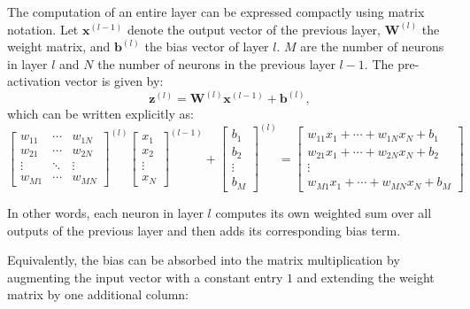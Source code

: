 The computation of an entire layer can be expressed compactly using matrix notation. Let $\mathbf{x}^{(l-1)}$ denote the output vector of the previous layer, $\mathbf{W}^{(l)}$ the weight matrix, and $\mathbf{b}^{(l)}$ the bias vector of layer $l$. $M$ are the number of neurons in layer $l$ and $N$ the number of neurons in the previous layer $l-1$. The pre-activation vector is given by:
\begin{equation}
	\mathbf{z}^{(l)} = \mathbf{W}^{(l)} \mathbf{x}^{(l-1)} + \mathbf{b}^{(l)},
\end{equation}
which can be written explicitly as:
\begin{equation}
	\begin{bmatrix}
		w_{11} & \cdots & w_{1N} \\
		w_{21} & \cdots & w_{2N} \\
		\vdots & \ddots & \vdots \\
		w_{M1} & \cdots & w_{MN}
	\end{bmatrix}^{(l)}
	\begin{bmatrix}
		x_1 \\
		x_2 \\
		\vdots \\
		x_N
	\end{bmatrix}^{(l-1)}
	+
	\begin{bmatrix}
		b_1 \\
		b_2 \\
		\vdots \\
		b_M
	\end{bmatrix}^{(l)}
	=
	\begin{bmatrix}
		w_{11}x_1 + \cdots + w_{1N}x_N + b_1 \\
		w_{21}x_1 + \cdots + w_{2N}x_N + b_2 \\
		\vdots \\
		w_{M1}x_1 + \cdots + w_{MN}x_N + b_M
	\end{bmatrix}
\end{equation}

In other words, each neuron in layer $l$ computes its own weighted sum over all outputs of the previous layer and then adds its corresponding bias term. 

Equivalently, the bias can be absorbed into the matrix multiplication by augmenting the input vector with a constant entry $1$ and extending the weight matrix by one additional column:

